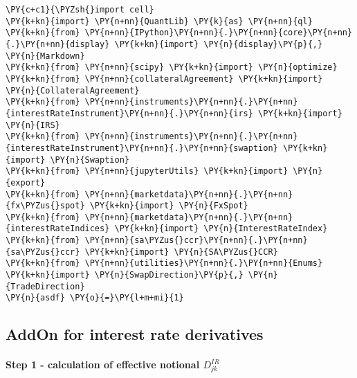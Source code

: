     

    
    \begin{tcolorbox}[breakable, size=fbox, boxrule=1pt, pad at break*=1mm,colback=cellbackground, colframe=cellborder]
\begin{Verbatim}[commandchars=\\\{\}]
\PY{c+c1}{\PYZsh{}import cell}
\PY{k+kn}{import} \PY{n+nn}{QuantLib} \PY{k}{as} \PY{n+nn}{ql}
\PY{k+kn}{from} \PY{n+nn}{IPython}\PY{n+nn}{.}\PY{n+nn}{core}\PY{n+nn}{.}\PY{n+nn}{display} \PY{k+kn}{import} \PY{n}{display}\PY{p}{,} \PY{n}{Markdown}
\PY{k+kn}{from} \PY{n+nn}{scipy} \PY{k+kn}{import} \PY{n}{optimize}
\PY{k+kn}{from} \PY{n+nn}{collateralAgreement} \PY{k+kn}{import} \PY{n}{CollateralAgreement}
\PY{k+kn}{from} \PY{n+nn}{instruments}\PY{n+nn}{.}\PY{n+nn}{interestRateInstrument}\PY{n+nn}{.}\PY{n+nn}{irs} \PY{k+kn}{import} \PY{n}{IRS}
\PY{k+kn}{from} \PY{n+nn}{instruments}\PY{n+nn}{.}\PY{n+nn}{interestRateInstrument}\PY{n+nn}{.}\PY{n+nn}{swaption} \PY{k+kn}{import} \PY{n}{Swaption}
\PY{k+kn}{from} \PY{n+nn}{jupyterUtils} \PY{k+kn}{import} \PY{n}{export}
\PY{k+kn}{from} \PY{n+nn}{marketdata}\PY{n+nn}{.}\PY{n+nn}{fx\PYZus{}spot} \PY{k+kn}{import} \PY{n}{FxSpot}
\PY{k+kn}{from} \PY{n+nn}{marketdata}\PY{n+nn}{.}\PY{n+nn}{interestRateIndices} \PY{k+kn}{import} \PY{n}{InterestRateIndex}
\PY{k+kn}{from} \PY{n+nn}{sa\PYZus{}ccr}\PY{n+nn}{.}\PY{n+nn}{sa\PYZus{}ccr} \PY{k+kn}{import} \PY{n}{SA\PYZus{}CCR}
\PY{k+kn}{from} \PY{n+nn}{utilities}\PY{n+nn}{.}\PY{n+nn}{Enums} \PY{k+kn}{import} \PY{n}{SwapDirection}\PY{p}{,} \PY{n}{TradeDirection}
\PY{n}{asdf} \PY{o}{=}\PY{l+m+mi}{1}
\end{Verbatim}
\end{tcolorbox}

    \hypertarget{addon-for-interest-rate-derivatives}{%
\subsection{AddOn for interest rate
derivatives}\label{addon-for-interest-rate-derivatives}}

\hypertarget{step-1---calculation-of-effective-notional-d_jkir}{%
\paragraph{\texorpdfstring{Step 1 - calculation of effective notional
\(D_{jk}^{IR}\)}{Step 1 - calculation of effective notional D\_\{jk\}\^{}\{IR\}}}\label{step-1---calculation-of-effective-notional-d_jkir}}

